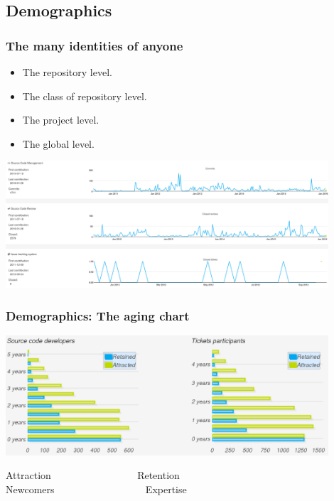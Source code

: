 \documentclass[17pt,aspectratio=169,hyperref=pdfusetitle]{beamer}
\begin{document}
\subsection{Demographics}


\begin{frame}
\frametitle{The many identities of anyone}

{\Large
  \begin{itemize}
  \item The repository level.
  \item The class of repository level.
  \item The project level.
  \item The global level.
  \end{itemize}
}

\begin{center}
  \includegraphics[width=12cm]{figs/person-profile}
\end{center}

\end{frame}


\begin{frame}
\frametitle{Demographics: The aging chart}

\begin{center}
  \includegraphics[width=12cm]{figs/aging-openstack}
\end{center}

{\Large
\begin{center}
  Attraction ~~~~~~~~~~~~~~~~ Retention \\
   Newcomers ~~~~~~~~~~~~~~~~~ Expertise\\
\end{center}
}

\end{frame}
\end{document}
